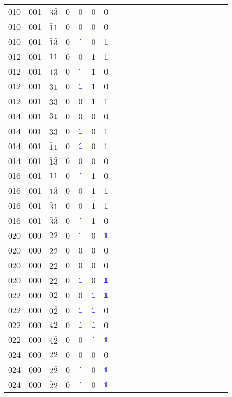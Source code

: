 \begin{longtable*}{c| cccccccccccccccccccc }
010& 001& $3\bar{3}$& 0& 0& 0& 0\\
010& 001& $\bar{1}1$& 0& 0& 0& 0\\
010& 001& $\bar{1}\bar{3}$& 0& \textcolor{blue}{$\mathds{1}$}& 0& 1\\
012& 001& $11$& 0& 0& 1& 1\\
012& 001& $1\bar{3}$& 0& \textcolor{blue}{$\mathds{1}$}& 1& 0\\
012& 001& $\bar{3}1$& 0& \textcolor{blue}{$\mathds{1}$}& 1& 0\\
012& 001& $\bar{3}\bar{3}$& 0& 0& 1& 1\\
014& 001& $31$& 0& 0& 0& 0\\
014& 001& $3\bar{3}$& 0& \textcolor{blue}{$\mathds{1}$}& 0& 1\\
014& 001& $\bar{1}1$& 0& \textcolor{blue}{$\mathds{1}$}& 0& 1\\
014& 001& $\bar{1}\bar{3}$& 0& 0& 0& 0\\
016& 001& $11$& 0& \textcolor{blue}{$\mathds{1}$}& 1& 0\\
016& 001& $1\bar{3}$& 0& 0& 1& 1\\
016& 001& $\bar{3}1$& 0& 0& 1& 1\\
016& 001& $\bar{3}\bar{3}$& 0& \textcolor{blue}{$\mathds{1}$}& 1& 0\\
020& 000& $22$& 0& \textcolor{blue}{$\mathds{1}$}& 0& \textcolor{blue}{$\mathds{1}$}\\
020& 000& $2\bar{2}$& 0& 0& 0& 0\\
020& 000& $\bar{2}2$& 0& 0& 0& 0\\
020& 000& $\bar{2}\bar{2}$& 0& \textcolor{blue}{$\mathds{1}$}& 0& \textcolor{blue}{$\mathds{1}$}\\
022& 000& $02$& 0& 0& \textcolor{blue}{$\mathds{1}$}& \textcolor{blue}{$\mathds{1}$}\\
022& 000& $0\bar{2}$& 0& \textcolor{blue}{$\mathds{1}$}& \textcolor{blue}{$\mathds{1}$}& 0\\
022& 000& $42$& 0& \textcolor{blue}{$\mathds{1}$}& \textcolor{blue}{$\mathds{1}$}& 0\\
022& 000& $4\bar{2}$& 0& 0& \textcolor{blue}{$\mathds{1}$}& \textcolor{blue}{$\mathds{1}$}\\
024& 000& $22$& 0& 0& 0& 0\\
024& 000& $2\bar{2}$& 0& \textcolor{blue}{$\mathds{1}$}& 0& \textcolor{blue}{$\mathds{1}$}\\
024& 000& $\bar{2}2$& 0& \textcolor{blue}{$\mathds{1}$}& 0& \textcolor{blue}{$\mathds{1}$}\\

\end{longtable*}
